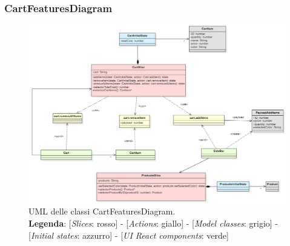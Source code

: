 \begin{landscape}
	\thispagestyle{empty}
	\subsubsection{CartFeaturesDiagram}
	\begin{figure}[H]
		\centering
		\includegraphics[scale=0.75, keepaspectratio]{./res/images/CartFeaturesDiagram.PNG}
		\caption[UML delle classi CartFeaturesDiagram]{
		UML delle classi CartFeaturesDiagram.
		\\
		\textbf{Legenda}: 
		[\textit{Slices}: rosso] -
		[\textit{Actions}: giallo] -
		[\textit{Model classes}: grigio] -
		[\textit{Initial states}: azzurro] -
		[\textit{UI React components}: verde]}
	\end{figure}
\end{landscape}
\restoregeometry

